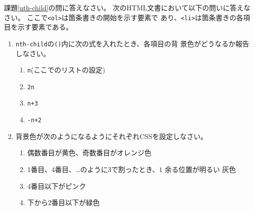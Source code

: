  \begin{Prob}\upshape\Must\label{nth-child}
  \ifText 課題\ref{nth-child}の問に答えなさい。
  \else
 次のHTML文書において以下の問いに答えなさい。
 ここで\texttt{<ol>}は箇条書きの開始を示す要素で
 あり、\texttt{<li>}は箇条書きの各項目を示す要素である。\fi
\begin{enumerate}
\item \texttt{nth-child}の\texttt{()}内に次の式を入れたとき、各項目の背
      景色がどうなるか報告しなさい。
\begin{enumerate}
 \item \texttt{n}(ここでのリストの設定)
 \item \texttt{2n}
 \item \texttt{n+3}
 \item \texttt{-n+2}
\end{enumerate}
 \item 背景色が次のようになるようにそれぞれCSSを設定しなさい。
\begin{enumerate}
 \item 偶数番目が黄色、奇数番目がオレンジ色
 \item 1番目、4番目、\dots のように$3$で割ったとき、$1$ 余る位置が明るい
       灰色
 \item 4番目以下がピンク
 \item 下から2番目以下が緑色
\end{enumerate}
\end{enumerate}
\end{Prob}

